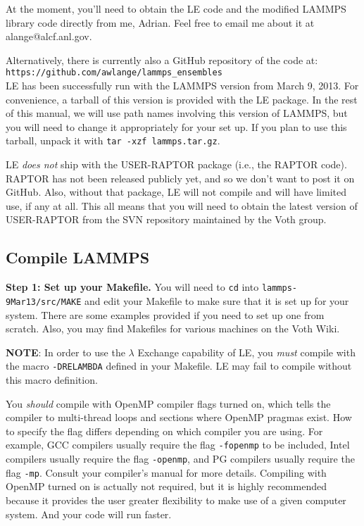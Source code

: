 \documentclass[10pt]{article}
\begin{document}
At the moment, you'll need to obtain the LE code and the modified LAMMPS
library code directly from me, Adrian. Feel free to email me about it at alange@alcf.anl.gov. 

Alternatively, there is currently also a GitHub repository of the code at:\\
\texttt{https://github.com/awlange/lammps\_ensembles}\\

LE has been successfully run with the LAMMPS version from
March 9, 2013. For convenience, a tarball of this version is provided with the LE package.
In the rest of this manual, we will use path names involving this version of LAMMPS, but
you will need to change it appropriately for your set up. If you plan to use this tarball,
unpack it with \texttt{tar -xzf lammps.tar.gz}.

LE {\em does not} ship with the USER-RAPTOR package (i.e., the RAPTOR code). RAPTOR has
not been released publicly yet, and so we don't want to post it on GitHub. Also, without that
package, LE will not compile and will have limited use, if any at all. This all means that
you will need to obtain the latest version of USER-RAPTOR from the SVN repository maintained
by the Voth group.


\subsection{Compile LAMMPS}\label{sec:LAMMPS}

\textbf{Step 1: Set up your Makefile.}
You will need to \texttt{cd} into \texttt{lammps-9Mar13/src/MAKE} and edit your Makefile to 
make sure that it is set up for your system. There are some examples provided if you need
to set up one from scratch. Also, you may find Makefiles for various machines on the Voth Wiki.

\textbf{NOTE}: In order to use the $\lambda$ Exchange capability of LE, you {\em must} compile with
the macro \texttt{-DRELAMBDA} defined in your Makefile. LE may fail to compile without this macro
definition.

You {\em should} compile with OpenMP compiler flags turned on, which tells the compiler
to multi-thread loops and sections where OpenMP pragmas exist. How to specify the flag differs 
depending on which compiler you are using. For example, GCC compilers usually require
the flag \texttt{-fopenmp} to be included, Intel compilers usually require
the flag \texttt{-openmp}, and PG compilers usually require the flag \texttt{-mp}.
Consult your compiler's manual for more details. 
Compiling with OpenMP turned on is actually not required, but it is highly recommended because
it provides the user greater flexibility to make use of a given computer system. And your code will
run faster.
\end{document}
